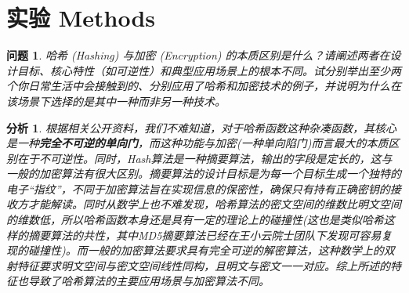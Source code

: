 \documentclass[12pt]{ctexart}
\newtheorem{problem}{问题}
\newtheorem{analogy}{分析}
\begin{document}
	\section{实验 Methods}
		\begin{problem}
			哈希 (Hashing) 与加密 (Encryption) 的本质区别是什么？请阐述两者在设计目标、核心特性（如可逆性）和典型应用场景上的根本不同。试分别举出至少两个你日常生活中会接触到的、分别应用了哈希和加密技术的例子，并说明为什么在该场景下选择的是其中一种而非另一种技术。
		\end{problem}
		\begin{analogy}
			根据相关公开资料\cite{hashwechat}，我们不难知道，对于哈希函数这种杂凑函数，其核心是一种\textbf{完全不可逆的单向门}，而这种功能与加密(一种单向陷门)而言最大的本质区别在于不可逆性。同时，Hash算法是一种摘要算法，输出的字段是定长的，这与一般的加密算法有很大区别。摘要算法的设计目标是为每一个目标生成一个独特的电子“指纹”，不同于加密算法旨在实现信息的保密性，确保只有持有正确密钥的接收方才能解读。同时从数学上也不难发现，哈希算法的密文空间的维数比明文空间的维数低，所以哈希函数本身还是具有一定的理论上的碰撞性(这也是类似哈希这样的摘要算法的共性，其中MD5摘要算法已经在王小云院士团队下发现可容易复现的碰撞性\cite{wang2005break})。而一般的加密算法要求具有完全可逆的解密算法，这种数学上的双射特征要求明文空间与密文空间线性同构，且明文与密文一一对应。综上所述的特征也导致了哈希算法的主要应用场景与加密算法不同。
			

\end{analogy}
\end{document}
